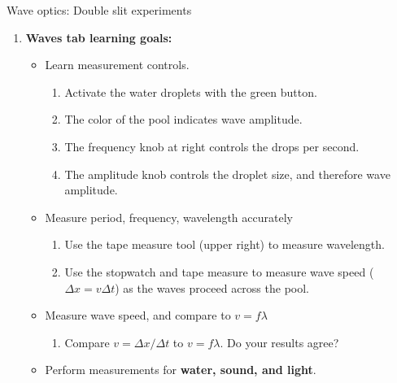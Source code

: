 \documentclass{beamer}
\begin{document}
\begin{frame}{Wave optics: Double slit experiments}
\footnotesize
\begin{enumerate}
\item \textbf{Waves tab learning goals:}
\begin{itemize}
\footnotesize
\item Learn measurement controls.
\begin{enumerate}
\item Activate the water droplets with the green button.
\item The color of the pool indicates wave amplitude.
\item The frequency knob at right controls the drops per second.
\item The amplitude knob controls the droplet size, and therefore wave amplitude.
\end{enumerate}
\item Measure period, frequency, wavelength accurately
\begin{enumerate}
\item Use the tape measure tool (upper right) to measure wavelength.
\item Use the stopwatch and tape measure to measure wave speed ($\Delta x = v \Delta t$) as the waves proceed across the pool.
\end{enumerate}
\item Measure wave speed, and compare to $v = f\lambda$
\begin{enumerate}
\item Compare $v = \Delta x/\Delta t$ to $v = f\lambda$.  Do your results agree?
\end{enumerate}
\item Perform measurements for \textbf{\alert{water, sound, and light}}.
\end{itemize}
\end{enumerate}
\end{frame}
\end{document}
